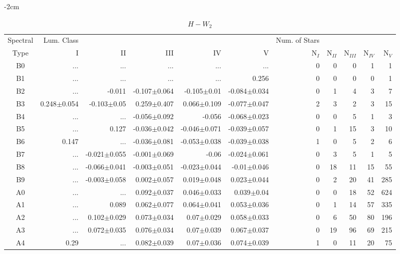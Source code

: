 \begin{table}[t]
\tiny
\centering
\caption{$H-W_{2}$}
\begin{center}
    \addtolength{\leftskip} {-2cm}
    \addtolength{\rightskip}{-2cm}
    \begin{tabular}{c|rrrrr|rrrrr}
    \toprule
    Spectral & Lum. Class & & & & & Num. of Stars & & & &  \\
    Type & I & II & III &  IV & V & N$_{I}$ & N$_{II}$ & N$_{III}$ & N$_{IV}$ & N$_{V}$ \\ \midrule
  
B0	&	 ...	&	 ...	&	 ...	&	 ...	&	 ...	&	0	&	0	&	0	&	1	&	1	\\
B1	&	 ...	&	 ...	&	 ...	&	 ...	&	0.256	&	0	&	0	&	0	&	0	&	1	\\
B2	&	 ...	&	-0.011	&	-0.107$\pm$0.064	&	-0.105$\pm$0.01	&	-0.084$\pm$0.034	&	0	&	1	&	4	&	3	&	7	\\
B3	&	0.248$\pm$0.054	&	-0.103$\pm$0.05	&	0.259$\pm$0.407	&	0.066$\pm$0.109	&	-0.077$\pm$0.047	&	2	&	3	&	2	&	3	&	15	\\
B4	&	 ...	&	 ...	&	-0.056$\pm$0.092	&	-0.056	&	-0.068$\pm$0.023	&	0	&	0	&	5	&	1	&	3	\\
B5	&	 ...	&	0.127	&	-0.036$\pm$0.042	&	-0.046$\pm$0.071	&	-0.039$\pm$0.057	&	0	&	1	&	15	&	3	&	10	\\
B6	&	0.147	&	 ...	&	-0.036$\pm$0.081	&	-0.053$\pm$0.038	&	-0.039$\pm$0.038	&	1	&	0	&	5	&	2	&	6	\\
B7	&	 ...	&	-0.021$\pm$0.055	&	-0.001$\pm$0.069	&	-0.06	&	-0.024$\pm$0.061	&	0	&	3	&	5	&	1	&	5	\\
B8	&	 ...	&	-0.066$\pm$0.041	&	-0.003$\pm$0.051	&	-0.023$\pm$0.044	&	-0.01$\pm$0.046	&	0	&	18	&	11	&	15	&	55	\\
B9	&	 ...	&	-0.003$\pm$0.058	&	0.002$\pm$0.057	&	0.019$\pm$0.048	&	0.023$\pm$0.044	&	0	&	2	&	20	&	41	&	285	\\
A0	&	 ...	&	 ...	&	0.092$\pm$0.037	&	0.046$\pm$0.033	&	0.039$\pm$0.04	&	0	&	0	&	18	&	52	&	624	\\
A1	&	 ...	&	0.089	&	0.062$\pm$0.077	&	0.064$\pm$0.041	&	0.053$\pm$0.036	&	0	&	1	&	14	&	57	&	335	\\
A2	&	 ...	&	0.102$\pm$0.029	&	0.073$\pm$0.034	&	0.07$\pm$0.029	&	0.058$\pm$0.033	&	0	&	6	&	50	&	80	&	196	\\
A3	&	 ...	&	0.072$\pm$0.035	&	0.076$\pm$0.034	&	0.07$\pm$0.039	&	0.067$\pm$0.037	&	0	&	19	&	96	&	69	&	215	\\
A4	&	0.29	&	 ...	&	0.082$\pm$0.039	&	0.07$\pm$0.036	&	0.074$\pm$0.039	&	1	&	0	&	11	&	20	&	75	\\

\end{tabular}
\end{center}
\end{table}

